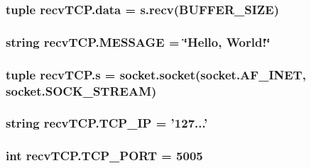 \subsubsection[{data}]{\setlength{\rightskip}{0pt plus 5cm}tuple recv\+T\+C\+P.\+data = s.\+recv({\bf B\+U\+F\+F\+E\+R\+\_\+\+S\+I\+Z\+E})}\label{namespacerecvTCP_a0e0f0e6192ae60f55f3d0ae1dc030b34}
\hypertarget{namespacerecvTCP_a27413dbbf510167047e66d7ac74f8dcd}{}
\subsubsection[{M\+E\+S\+S\+A\+G\+E}]{\setlength{\rightskip}{0pt plus 5cm}string recv\+T\+C\+P.\+M\+E\+S\+S\+A\+G\+E = \char`\"{}Hello, World!\char`\"{}}\label{namespacerecvTCP_a27413dbbf510167047e66d7ac74f8dcd}
\hypertarget{namespacerecvTCP_ac7cccc8bf562ba5f52c30b9cb307c314}{}
\subsubsection[{s}]{\setlength{\rightskip}{0pt plus 5cm}tuple recv\+T\+C\+P.\+s = socket.\+socket(socket.\+A\+F\+\_\+\+I\+N\+E\+T, socket.\+S\+O\+C\+K\+\_\+\+S\+T\+R\+E\+A\+M)}\label{namespacerecvTCP_ac7cccc8bf562ba5f52c30b9cb307c314}
\hypertarget{namespacerecvTCP_aa3be6842108a875b8df9a713e7b360b7}{}
\subsubsection[{T\+C\+P\+\_\+\+I\+P}]{\setlength{\rightskip}{0pt plus 5cm}string recv\+T\+C\+P.\+T\+C\+P\+\_\+\+I\+P = '127...'}\label{namespacerecvTCP_aa3be6842108a875b8df9a713e7b360b7}
\hypertarget{namespacerecvTCP_a65987d0f95cb5a729ceb73f1cac6ed28}{}
\subsubsection[{T\+C\+P\+\_\+\+P\+O\+R\+T}]{\setlength{\rightskip}{0pt plus 5cm}int recv\+T\+C\+P.\+T\+C\+P\+\_\+\+P\+O\+R\+T = 5005}\label{namespacerecvTCP_a65987d0f95cb5a729ceb73f1cac6ed28}
